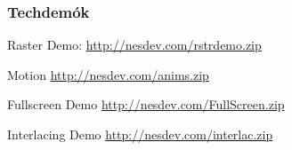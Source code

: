\subsubsection{Techdemók}
\begin{compactitem}
	\item Raster Demo: \url{http://nesdev.com/rstrdemo.zip}
	\item Motion \url{http://nesdev.com/anims.zip}
	\item Fullscreen Demo \url{http://nesdev.com/FullScreen.zip}
	\item Interlacing Demo \url{http://nesdev.com/interlac.zip}
\end{compactitem}



